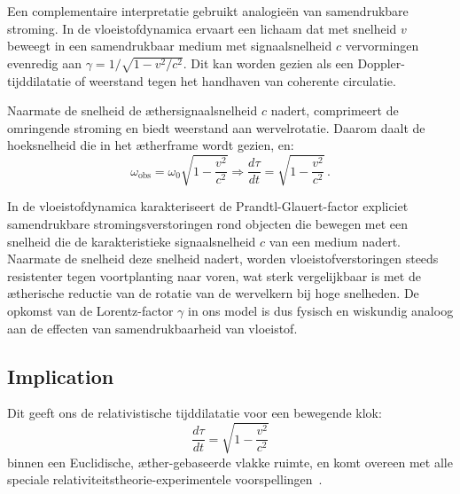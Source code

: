 Een complementaire interpretatie gebruikt analogieën van samendrukbare stroming. In de vloeistofdynamica ervaart een lichaam dat met snelheid $v$ beweegt in een samendrukbaar medium met signaalsnelheid $c$ vervormingen evenredig aan $\gamma = 1/\sqrt{1 - v^2/c^2}$. Dit kan worden gezien als een Doppler-tijddilatatie of weerstand tegen het handhaven van coherente circulatie.

Naarmate de snelheid de æthersignaalsnelheid $c$ nadert, comprimeert de omringende stroming en biedt weerstand aan wervelrotatie. Daarom daalt de hoeksnelheid die in het ætherframe wordt gezien, en:
\[
    \omega_\text{obs} = \omega_0 \sqrt{1 - \frac{v^2}{c^2}} \Rightarrow \frac{d\tau}{dt} = \sqrt{1 - \frac{v^2}{c^2}} \,. \tag{3}
\]

In de vloeistofdynamica karakteriseert de Prandtl-Glauert-factor expliciet samendrukbare stromingsverstoringen rond objecten die bewegen met een snelheid die de karakteristieke signaalsnelheid $c$ van een medium nadert. Naarmate de snelheid deze snelheid nadert, worden vloeistofverstoringen steeds resistenter tegen voortplanting naar voren, wat sterk vergelijkbaar is met de ætherische reductie van de rotatie van de wervelkern bij hoge snelheden. De opkomst van de Lorentz-factor $\gamma$ in ons model is dus fysisch en wiskundig analoog aan de effecten van samendrukbaarheid van vloeistof.

\subsection*{Implication}

Dit geeft ons de relativistische tijddilatatie voor een bewegende klok:
\[
    \boxed{\frac{d\tau}{dt} = \sqrt{1 - \frac{v^2}{c^2}}}
\]
binnen een Euclidische, æther-gebaseerde vlakke ruimte, en komt overeen met alle speciale relativiteitstheorie-experimentele voorspellingen~\cite{Rado2020-æther-Lorentz,Levy2009-æther-clock}.